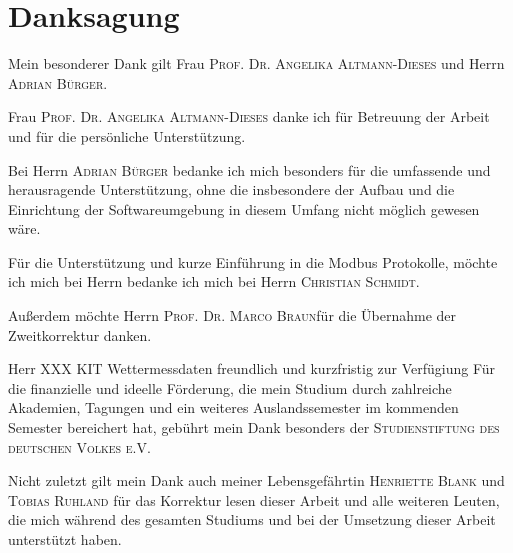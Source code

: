 %
%
%
\chapter*{Danksagung}
\thispagestyle{empty}

\noindent Mein besonderer Dank gilt Frau \textsc{Prof. Dr. Angelika Altmann-Dieses} und Herrn \textsc{Adrian Bürger}.

\noindent Frau \textsc{Prof. Dr. Angelika Altmann-Dieses} danke ich für Betreuung der Arbeit und für die persönliche Unterstützung.

\noindent Bei Herrn \textsc{Adrian Bürger} bedanke ich mich besonders für die umfassende und herausragende Unterstützung, ohne die insbesondere der Aufbau und die Einrichtung der Softwareumgebung in diesem Umfang nicht möglich gewesen wäre.

\noindent Für die Unterstützung und kurze Einführung in die Modbus Protokolle, möchte ich mich bei Herrn bedanke ich mich bei Herrn \textsc{Christian Schmidt}.

\noindent Außerdem möchte Herrn \textsc{Prof. Dr. Marco Braun}für die Übernahme der Zweitkorrektur danken.

\noindent Herr XXX KIT Wettermessdaten freundlich und kurzfristig zur Verfügiung
\noindent Für die finanzielle und ideelle Förderung, die mein Studium durch zahlreiche Akademien, Tagungen und ein weiteres Auslandssemester im kommenden Semester bereichert hat, gebührt mein Dank besonders der \textsc{Studienstiftung des deutschen Volkes e.V.}

\noindent Nicht zuletzt gilt mein Dank auch meiner Lebensgefährtin \textsc{Henriette Blank} und \textsc{Tobias Ruhland} für das Korrektur lesen dieser Arbeit und alle weiteren Leuten, die mich während des gesamten Studiums und bei der Umsetzung dieser Arbeit unterstützt haben.